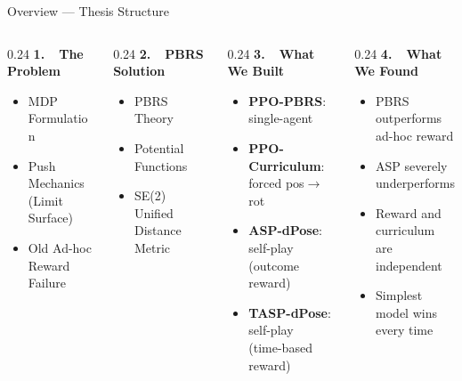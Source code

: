 \documentclass[aspectratio=169,xcolor=dvipsnames,t]{beamer}
\begin{document}
\begin{frame}[t]{Overview — Thesis Structure}
  \vspace*{-0.35cm}
  \footnotesize
  \begin{columns}[T,onlytextwidth]
    \begin{column}{0.24\textwidth}
      {\textbf{\color{hlblue}1.\ \ The Problem}}
      \begin{itemize}
        \item MDP Formulation
        \item Push Mechanics \\ (Limit Surface)
        \item Old Ad-hoc Reward \\ Failure
      \end{itemize}
    \end{column}
    \begin{column}{0.24\textwidth}
      {\textbf{\color{hlblue}2.\ \ PBRS Solution}}
      \begin{itemize}
        \item PBRS Theory
        \item Potential Functions
        \item SE(2) Unified \\ Distance Metric
      \end{itemize}
    \end{column}
    \begin{column}{0.24\textwidth}
      {\textbf{\color{hlblue}3.\ \ What We Built}}
      \begin{itemize}
        \item \textbf{PPO-PBRS}: single-agent
        \item \textbf{PPO-Curriculum}: \\ forced pos$\to$rot
        \item \textbf{ASP-dPose}: self-play \\ (outcome reward)
        \item \textbf{TASP-dPose}: self-play \\ (time-based reward)
      \end{itemize}
    \end{column}
    \begin{column}{0.24\textwidth}
      {\textbf{\color{hlgreen}4.\ \ What We Found}}
      \begin{itemize}
        \item PBRS outperforms \\ ad-hoc reward
        \item ASP severely \\ underperforms
        \item Reward and curriculum \\ are independent
        \item Simplest model wins \\ every time
      \end{itemize}
    \end{column}
  \end{columns}
\end{frame}
\end{document}
